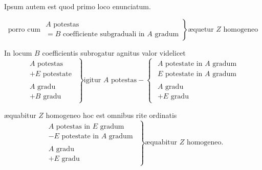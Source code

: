 \documentclass[11pt,a4paper]{article}
\begin{document}
Ipsum autem est quod primo loco enunciatum.

\[ \text{porro cum } \left.\begin{array}{l} A \text{ potestas} \\ = B \text{ coefficiente subgraduali in } A \text{ gradum} \end{array}\right\} \text{æquetur } Z \text{ homogeneo} \]

In locum $B$ coefficientis subrogatur agnitus valor videlicet
\[ \left.\begin{array}{c} \begin{array}{l} A \text{ potestas} \\ + E \text{ potestate} \end{array} \\ \hline \begin{array}{l} A \text{ gradu} \\ + B \text{ gradu} \end{array} \end{array}\right\} \text{igitur } A \text{ potestas} - \left\{\begin{array}{c} \begin{array}{l} A \text{ potestate in } A \text{ gradum} \\ E \text{ potestate in } A \text{ gradum} \end{array} \\ \hline \begin{array}{l} A \text{ gradu} \\ + E \text{ gradu} \end{array} \end{array}\right. \]

æquabitur $Z$ homogeneo hoc est omnibus rite ordinatis
\[ \left.\begin{array}{c} \begin{array}{l} A \text{ potestas in } E \text{ gradum} \\ - E \text{ potestate in } A \text{ gradum} \end{array} \\ \hline \begin{array}{l} A \text{ gradu} \\ + E \text{ gradu} \end{array} \end{array}\right\} \text{æquabitur } Z \text{ homogeneo.} \]
\end{document}
